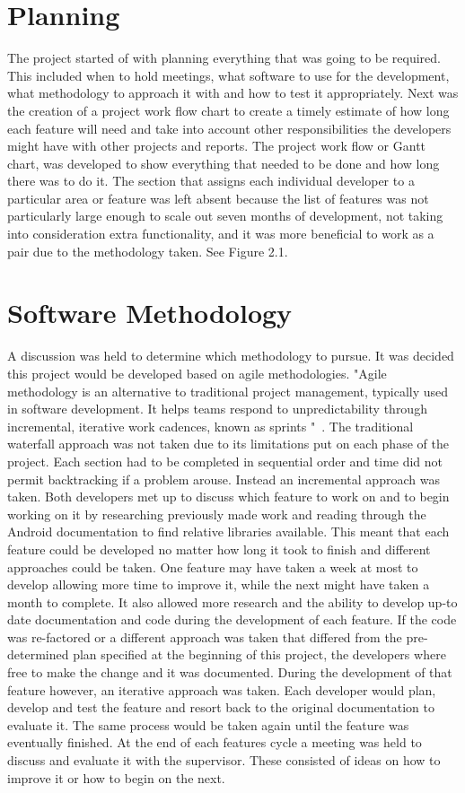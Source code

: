 \section{Planning}
The project started of with planning everything that was going to be required. This included when to hold meetings, what software to use for the development, what methodology to approach it with and how to test it appropriately. Next was the creation of a project work flow chart to create a timely estimate of how long each feature will need and take into account other responsibilities the developers might have with other projects and reports. The project work flow or Gantt chart, was developed to show everything that needed to be done and how long there was to do it. The section that assigns each individual developer to a particular area or feature was left absent because the list of features was not particularly large enough to scale out seven months of development, not taking into consideration extra functionality, and it was more beneficial to work as a pair due to the methodology taken. See Figure 2.1.

\section{Software Methodology}
A discussion was held to determine which methodology to pursue. It was decided this project would be developed based on agile methodologies. "Agile methodology is an alternative to traditional project management, typically used in software development. It helps teams respond to unpredictability through incremental, iterative work cadences, known as sprints "~\cite{agile}. The traditional waterfall approach was not taken due to its limitations put on each phase of the project. Each section had to be completed in sequential order and time did not permit backtracking if a problem arouse. Instead an incremental approach was taken. Both developers met up to discuss which feature to work on and to begin working on it by researching previously made work and reading through the Android documentation to find relative libraries available. This meant that each feature could be developed no matter how long it took to finish and different approaches could be taken. One feature may have taken a week at most to develop allowing  more time to improve it, while the next might have taken a month to complete. It also allowed more research and the ability to develop up-to date documentation and code during the development of each feature. If the code was re-factored or a different approach was taken that differed from the pre-determined plan specified at the beginning of this project, the developers where free to make the change and it was documented. During the development of that feature however, an iterative approach was taken. Each developer would plan, develop and test the feature and resort back to the original documentation to evaluate it. The same process would be taken again until the feature was eventually finished. At the end of each features cycle a meeting was held to discuss and evaluate it with the supervisor. These consisted of ideas on how to improve it or how to begin on the next. 

